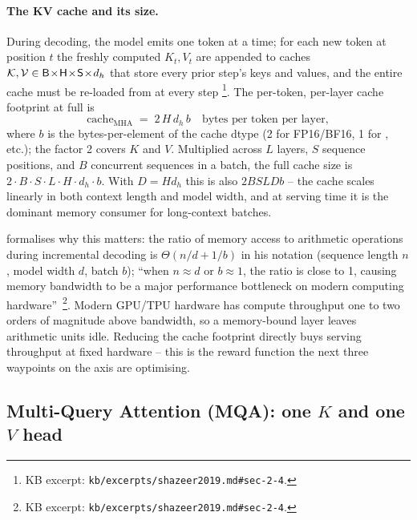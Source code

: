 \paragraph{The KV cache and its size.} During 
decoding, the model emits one token at a time; for each new token at
position $t$ the freshly computed $K_t, V_t$ are appended to caches
$\mathcal{K}, \mathcal{V} \in \mathsf{B}\!\times\!\mathsf{H}\!\times\!\mathsf{S}\!\times\!d_h$ that store every prior step's
keys and values, and the entire cache must be re-loaded from  at
every step \citep[\S 1, \S 2.4]{shazeer2019}%
\footnote{KB excerpt: \texttt{kb/excerpts/shazeer2019.md\#sec-2-4}.}.
The per-token, per-layer cache footprint at full  is
\begin{equation}
  \mathrm{cache}_{\mathrm{MHA}} \;=\;
  2\,H\,d_h\,b
  \quad\text{bytes per token per layer},
  \label{eq:mha-cache}
\end{equation}
where $b$ is the bytes-per-element of the cache dtype (2 for FP16/BF16,
1 for , etc.); the factor 2 covers $K$ and $V$. Multiplied across
$L$ layers, $S$ sequence positions, and $B$ concurrent sequences in a
batch, the full cache size is $2 \cdot B \cdot S \cdot L \cdot H
\cdot d_h \cdot b$. With $D = H d_h$ this is also $2 B S L D b$ -- the
cache scales linearly in both context length and model width, and at
serving time it is the dominant memory consumer for long-context
batches.

\citet{shazeer2019} formalises why this matters: the ratio of memory
access to arithmetic operations during incremental decoding is
$\Theta(n/d + 1/b)$ in his notation (sequence length $n$, model width
$d$, batch $b$); ``when $n \approx d$ or $b \approx 1$, the ratio is
close to 1, causing memory bandwidth to be a major performance
bottleneck on modern computing hardware''~\citep[\S
2.4]{shazeer2019}\footnote{KB excerpt:
\texttt{kb/excerpts/shazeer2019.md\#sec-2-4}.}. Modern GPU/TPU
hardware has compute throughput one to two orders of magnitude above
 bandwidth, so a memory-bound layer leaves arithmetic units
idle. Reducing the cache footprint directly buys serving throughput
at fixed hardware -- this is the reward function the next three
waypoints on the axis are optimising.

\subsection{Multi-Query Attention (MQA): one $K$ and one $V$ head}
\label{sec:attn-mqa}

